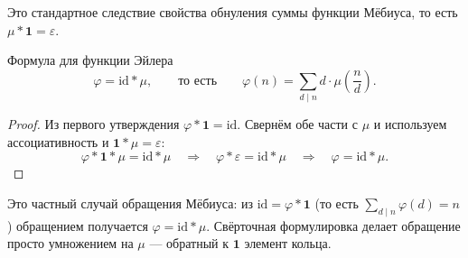 Это стандартное следствие свойства обнуления суммы функции Мёбиуса, то есть $\mu*\mathbf 1=\varepsilon$.

\begin{Theorem}{Формула для функции Эйлера}{}
	\[
	\varphi=\mathrm{id}*\mu,\qquad\text{то есть}\qquad
	\varphi(n)=\sum_{d\mid n}d\cdot\mu\!\left(\frac{n}{d}\right).
	\]
\end{Theorem}

\begin{proof}
	Из первого утверждения $\varphi*\mathbf 1=\mathrm{id}$. Свернём обе части с $\mu$ и используем ассоциативность и $\mathbf 1*\mu=\varepsilon$:
	\[
	\varphi*\mathbf 1*\mu=\mathrm{id}*\mu
	\quad\Longrightarrow\quad
	\varphi*\varepsilon=\mathrm{id}*\mu
	\quad\Longrightarrow\quad
	\varphi=\mathrm{id}*\mu.
	\]
\end{proof}

\begin{Remark}{}{}
	Это частный случай обращения Мёбиуса: из $\mathrm{id}=\varphi*\mathbf 1$ (то есть $\sum_{d\mid n}\varphi(d)=n$) обращением получается $\varphi=\mathrm{id}*\mu$. Свёрточная формулировка делает обращение просто умножением на $\mu$ — обратный к $\mathbf 1$ элемент кольца.
\end{Remark}
